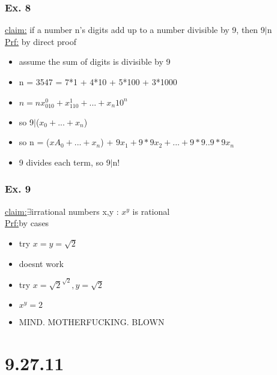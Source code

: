 \documentclass[a4paper]{article}
\newcommand{\te}{$\exists$}
\newcommand{\bi}{\begin{itemize}}
\newcommand{\ei}{\end{itemize}}
\newcommand{\claim}{\underline{claim:}}
\newcommand{\prf}{\underline{Prf:}}
\begin{document}
\begin{itemize}
      \subsubsection{Ex. 8}
        \underline{claim:} if a number n's digits add up to a number divisible by 9,
        then 9$|$n\\
        \underline{Prf:} by direct proof
        \begin{itemize}
          \item assume the sum of digits is divisible by 9
          \item n = 3547 = 7*1 + 4*10 + 5*100 + 3*1000
          \item $n = nx_010^0 + x_110^1 + ... + x_n10^n$
          \item so 9$|$($x_0 + ... + x_n$)
          \item so n = ($xA_0 + ... + x_n$) + $9x_1 + 9*9x_2 + ... + 9*9..9*9x_n$
          \item 9 divides each term, so 9$|$n!
        \end{itemize}
      \subsubsection{Ex. 9}
        \claim \te irrational numbers x,y : $x^y$ is rational\\
        \prf by cases
        \bi
          \item try $x=y=\sqrt{2}$
          \item doesnt work
          \item try $x=\sqrt{2}^{\sqrt{2}} , y=\sqrt{2}$
          \item $x^y = 2$
          \item MIND. MOTHERFUCKING. BLOWN
        \ei
  \section{9.27.11}

\end{itemize}
\end{document}
